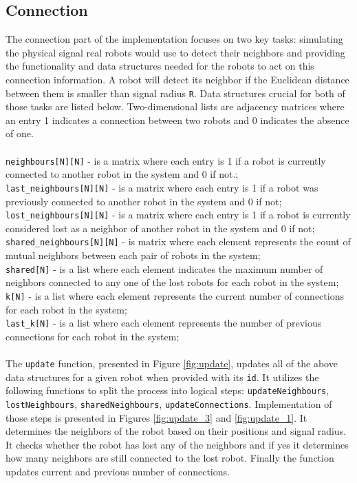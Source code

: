 \subsection{Connection}
The connection part of the implementation focuses on two key tasks: simulating the physical signal real robots would use to detect their neighbors and providing the functionality and data structures needed for the robots to act on this connection information. A robot will detect its neighbor if the Euclidean distance between them is smaller than signal radius \texttt{R}. Data structures crucial for both of those tasks are listed below. Two-dimensional lists are adjacency matrices where an entry 1 indicates a connection between two robots and 0 indicates the absence of one. \\\\
\texttt{neighbours[N][N]} - is a matrix where each entry is 1 if a robot is currently connected to another robot in the system and 0 if not.;\\
\texttt{last\_neighbours[N][N]} - is a matrix where each entry is 1 if a robot was previously connected to another robot in the system and 0 if not;\\ 
\texttt{lost\_neighbours[N][N]} - is a matrix where each entry is 1 if a robot is currently considered lost as a neighbor of another robot in the system and 0 if not;\\
\texttt{shared\_neighbours[N][N]} - is matrix where each element represents the count of mutual neighbors between each pair of robots in the system;\\
\texttt{shared[N]} - is a list where each element indicates the maximum number of neighbors connected to any one of the lost robots for each robot in the system;\\
\texttt{k[N]} - is a list where each element represents the current number of connections for each robot in the system;\\
\texttt{last\_k[N]} - is a list where each element represents the number of previous connections for each robot in the system;\\
\\
The \texttt{update} function, presented in Figure \ref{fig:update}, updates all of the above data structures for a given robot when provided with its \texttt{id}. It utilizes the following functions to split the process into logical steps: \texttt{updateNeighbours}, \texttt{lostNeighbours}, \texttt{sharedNeighbours}, \texttt{updateConnections}. Implementation of those steps is presented in Figures \ref{fig:update_3} and \ref{fig:update_1}. It determines the neighbors of the robot based on their positions and signal radius. It checks whether the robot has lost any of the neighbors and if yes it determines how many neighbors are still connected to the lost robot. Finally the function updates current and previous number of connections.

